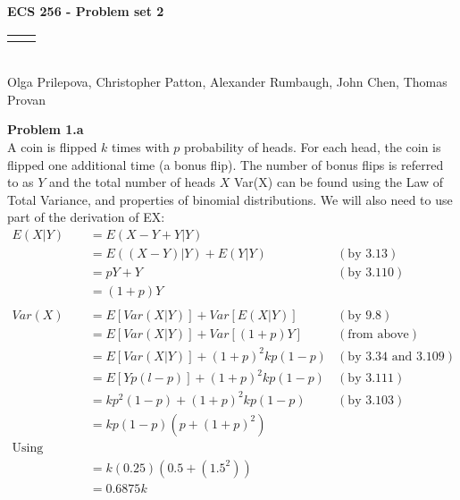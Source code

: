 \documentclass[12pt]{article}
\renewcommand{\title}[1]{\textbf{#1}\\}
\renewcommand{\line}{\begin{tabularx}{\textwidth}{X>{\raggedleft}X}\hline\\\end{tabularx}\\[-0.5cm]}
\begin{document}
\title{ECS 256 - Problem set 2}
\line
Olga Prilepova, Christopher Patton, Alexander Rumbaugh, John Chen, Thomas Provan

\textbf{Problem 1.a}\\
A coin is flipped $k$ times with $p$ probability of heads. For each head, the coin is flipped one additional time (a bonus flip). The number of bonus flips is referred to as $Y$ and the total number of heads $X$\newline
\newline
Var(X) can be found using the Law of Total Variance, and properties of binomial distributions. We will also need to use part of the derivation of EX:
\begin{equation*}
	\begin{aligned}
	E(X|Y)&= E({X - Y} + Y | Y)\\
	  &= E((X-Y)|Y) + E(Y|Y) &(\textrm{by 3.13})\\
	  &= pY + Y &(\textrm{by 3.110})\\
	  &= (1+p)Y\\
	  \\
	Var(X)	&= E[Var(X|Y)] + Var[E(X|Y)]	&(\textrm{by 9.8})\\
			&= E[Var(X|Y)] + Var[(1+p)Y]	&(\textrm{from above})\\
			&= E[Var(X|Y)] + (1+p)^{2}kp(1-p) &(\textrm{by 3.34 and 3.109})\\
			&= E[Yp(l-p)]  + (1+p)^{2}kp(1-p) &(\textrm{by 3.111})\\
			&= kp^{2}(1-p) + (1+p)^{2}kp(1-p) &(\textrm{by 3.103}) \\
			&= kp(1-p)\left(p+(1+p)^2\right)\\
			\textrm{Using p=0.5} \\
			&= k(0.25)(0.5+(1.5^{2}))\\
			&= 0.6875k\\
	\end{aligned}
\end{equation*}
\end{document}
